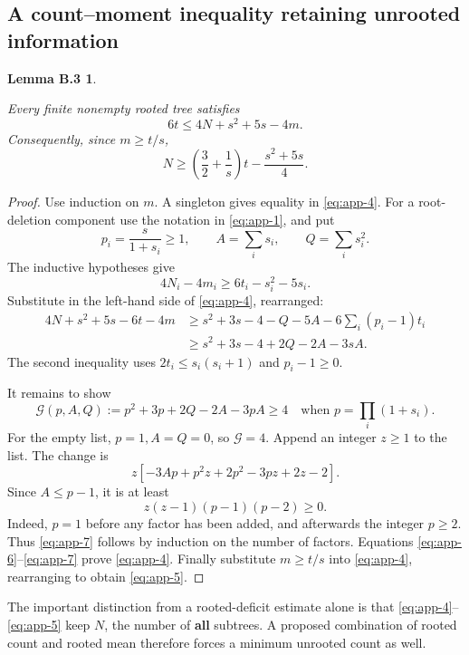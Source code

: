 \documentclass[11pt,letterpaper]{article}
\theoremstyle{plain}
\newtheorem*{applemmathree}{Lemma B.3}
\begin{document}
\subsection{A count--moment inequality retaining unrooted information}\label{b.2.-a-countmoment-inequality-retaining-unrooted-information}

\begin{applemmathree}\label{lem:app-3}

Every finite nonempty rooted tree satisfies \[
\boxed{6t\le4N+s^2+5s-4m.}
\tag{B.4}\label{eq:app-4}
\] Consequently, since \(m\ge t/s\), \[
\boxed{
N\ge\left(\frac32+\frac1s\right)t-\frac{s^2+5s}{4}.
}
\tag{B.5}\label{eq:app-5}
\]

\end{applemmathree}

\begin{proof} Use induction on \(m\). A singleton gives equality in \eqref{eq:app-4}. For a root-deletion component use the notation in \eqref{eq:app-1}, and put \[
p_i=\frac{s}{1+s_i}\ge1,\qquad A=\sum_i s_i,\qquad Q=\sum_i s_i^2.
\] The inductive hypotheses give \[
4N_i-4m_i\ge6t_i-s_i^2-5s_i.
\] Substitute in the left-hand side of \eqref{eq:app-4}, rearranged: \[
\begin{aligned}
4N+s^2+5s-6t-4m
&\ge s^2+3s-4-Q-5A
       -6\sum_i(p_i-1)t_i\\
&\ge s^2+3s-4+2Q-2A-3sA.
\end{aligned}
\tag{B.6}\label{eq:app-6}
\] The second inequality uses \(2t_i\le s_i(s_i+1)\) and \(p_i-1\ge0\).

It remains to show \[
\mathcal G(p,A,Q):=p^2+3p+2Q-2A-3pA\ge4
\quad\text{when }p=\prod_i(1+s_i).
\tag{B.7}\label{eq:app-7}
\] For the empty list, \(p=1,A=Q=0\), so \(\mathcal G=4\). Append an integer \(z\ge1\) to the list. The change is \[
z[-3Ap+p^2z+2p^2-3pz+2z-2].
\] Since \(A\le p-1\), it is at least \[
z(z-1)(p-1)(p-2)\ge0.
\] Indeed, \(p=1\) before any factor has been added, and afterwards the integer \(p\ge2\). Thus \eqref{eq:app-7} follows by induction on the number of factors. Equations \eqref{eq:app-6}--\eqref{eq:app-7} prove \eqref{eq:app-4}. Finally substitute \(m\ge t/s\) into \eqref{eq:app-4}, rearranging to obtain \eqref{eq:app-5}. \end{proof}

The important distinction from a rooted-deficit estimate alone is that \eqref{eq:app-4}--\eqref{eq:app-5} keep \(N\), the number of \textbf{all} subtrees. A proposed combination of rooted count and rooted mean therefore forces a minimum unrooted count as well.
\end{document}
